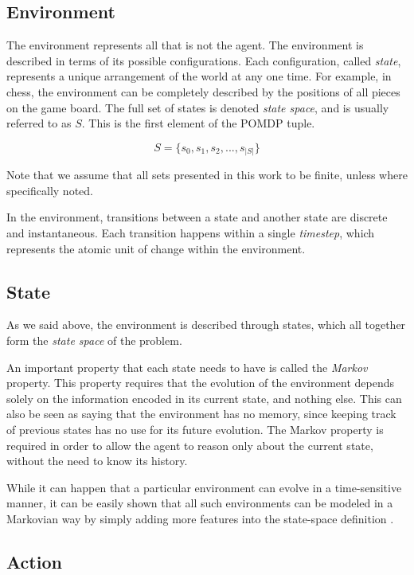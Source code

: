 \subsection{Environment}

The environment represents all that is not the agent. The environment is described in terms of its
possible configurations.  Each configuration, called \textit{state}, represents a unique
arrangement of the world at any one time. For example, in chess, the environment can be completely
described by the positions of all pieces on the game board. The full set of states is denoted
\textit{state space}, and is usually referred to as $S$. This is the first element of the POMDP
tuple.

\[ S = \{s_0, s_1, s_2, ..., s_{|S|}\} \]

Note that we assume that all sets presented in this work to be finite, unless where specifically
noted.

In the environment, transitions between a state and another state are discrete and instantaneous.
Each transition happens within a single \textit{timestep}, which represents the atomic unit of
change within the environment.

\subsection{State}

As we said above, the environment is described through states, which all together form the
\textit{state space} of the problem.

An important property that each state needs to have is called the \textit{Markov} property. This
property requires that the evolution of the environment depends solely on the information encoded in
its current state, and nothing else. This can also be seen as saying that the environment has no
memory, since keeping track of previous states has no use for its future evolution. The Markov
property is required in order to allow the agent to reason only about the current state, without the
need to know its history.

While it can happen that a particular environment can evolve in a time-sensitive manner, it can be
easily shown that all such environments can be modeled in a Markovian way by simply adding more
features into the state-space definition \cite{cit:boutilier}.


\subsection{Action}

